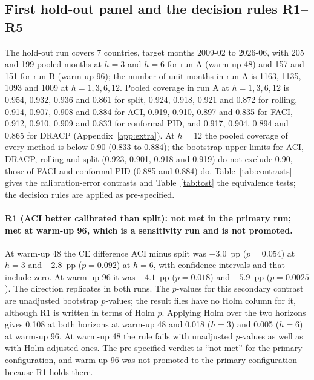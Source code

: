 \subsection{First hold-out panel and the decision rules R1--R5}\label{sec:holdout}

The hold-out run covers 7 countries, target months 2009-02 to 2026-06, with 205 and 199 pooled months at $h=3$ and $h=6$ for run A (warm-up 48) and 157 and 151 for run B (warm-up 96); the number of unit-months in run A is 1163, 1135, 1093 and 1009 at $h=1,3,6,12$. Pooled coverage in run A at $h=1,3,6,12$ is 0.954, 0.932, 0.936 and 0.861 for split, 0.924, 0.918, 0.921 and 0.872 for rolling, 0.914, 0.907, 0.908 and 0.884 for ACI, 0.919, 0.910, 0.897 and 0.835 for FACI, 0.912, 0.910, 0.909 and 0.833 for conformal PID, and 0.917, 0.904, 0.894 and 0.865 for DRACP (Appendix~\ref{app:extra}). At $h=12$ the pooled coverage of every method is below 0.90 (0.833 to 0.884); the bootstrap upper limits for ACI, DRACP, rolling and split (0.923, 0.901, 0.918 and 0.919) do not exclude 0.90, those of FACI and conformal PID (0.885 and 0.884) do. Table~\ref{tab:contrasts} gives the calibration-error contrasts and Table~\ref{tab:tost} the equivalence tests; the decision rules are applied as pre-specified.

\begin{table}[t]
\centering
\caption{Primary-family calibration-error contrasts by panel and base model: $T$ (pp of CE), 95\% block-bootstrap interval, Holm-adjusted $p$, minimum detectable difference (MDE) and verdict under the power rule.}
\label{tab:contrasts}
\small
\fittable{}
\end{table}

\begin{table}[t]
\centering
\caption{Equivalence of DRACP and ACI by two one-sided tests with a margin of 2~pp of CE, and the status of each contrast under the power rule.}
\label{tab:tost}
\small
\fittable{}
\end{table}

\paragraph{R1 (ACI better calibrated than split): not met in the primary run; met at warm-up 96, which is a sensitivity run and is not promoted.} At warm-up 48 the CE difference ACI minus split was $-3.0$~pp ($p=0.054$) at $h=3$ and $-2.8$~pp ($p=0.092$) at $h=6$, with confidence intervals  and  that include zero. At warm-up 96 it was $-4.1$~pp ($p=0.018$) and $-5.9$~pp ($p=0.0025$). The direction replicates in both runs. The $p$-values for this secondary contrast are unadjusted bootstrap $p$-values; the result files have no Holm column for it, although R1 is written in terms of Holm $p$. Applying Holm over the two horizons gives 0.108 at both horizons at warm-up 48 and 0.018 ($h=3$) and 0.005 ($h=6$) at warm-up 96. At warm-up 48 the rule fails with unadjusted $p$-values as well as with Holm-adjusted ones. The pre-specified verdict is ``not met'' for the primary configuration, and warm-up 96 was not promoted to the primary configuration because R1 holds there.

